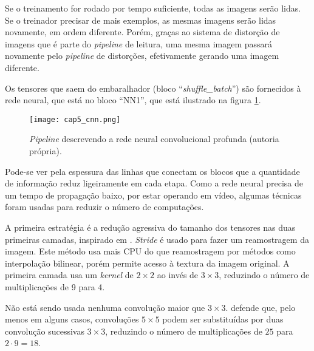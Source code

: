 Se o treinamento for rodado por tempo suficiente, todas as imagens serão
lidas. Se o treinador precisar de mais exemplos, as mesmas imagens serão lidas
novamente, em ordem diferente. Porém, graças ao sistema de distorção de
imagens que é parte do \emph{pipeline} de leitura, uma mesma imagem passará
novamente
pelo \emph{pipeline} de distorções, efetivamente gerando uma imagem diferente.

Os tensores que saem do embaralhador (bloco ``\emph{shuffle\_batch}'') são
fornecidos à rede neural, que está no
bloco ``NN1'', que está ilustrado na figura \ref{fig:cap5_cnn}.

\begin{figure}[!htb]
	\centering
	\texttt{[image: cap5\_cnn.png]}
	\caption[\emph{Pipeline} descrevendo a rede neural convolucional profunda]{
		\emph{Pipeline} descrevendo a rede neural convolucional profunda
		(autoria própria).}
	\label{fig:cap5_cnn}
\end{figure}

Pode-se ver pela espessura das linhas que conectam os blocos que a quantidade
de informação reduz ligeiramente em cada etapa. Como a rede neural precisa
de um tempo de propagação baixo, por estar operando em vídeo, algumas técnicas
foram usadas para reduzir o número de computações.

A primeira estratégia é a redução agressiva do tamanho dos tensores nas duas
primeiras camadas, inspirado em \cite{szegedy2015going}. \emph{Stride} é usado
para fazer um reamostragem da imagem. Este método usa mais CPU do que
reamostragem por métodos como interpolação bilinear, porém permite acesso
à textura da imagem original. A
primeira camada usa um \emph{kernel} de $2 \times 2$ ao invés de $3 \times 3$,
reduzindo o número de multiplicações de 9 para 4.

Não está sendo usada nenhuma convolução maior que $3 \times 3$.
 defende que, pelo menos em alguns casos,
convoluções $5 \times 5$ podem ser substituídas por duas convolução
sucessivas $3 \times 3$, reduzindo o número de
multiplicações de $25$ para $2 \cdot 9=18$.

